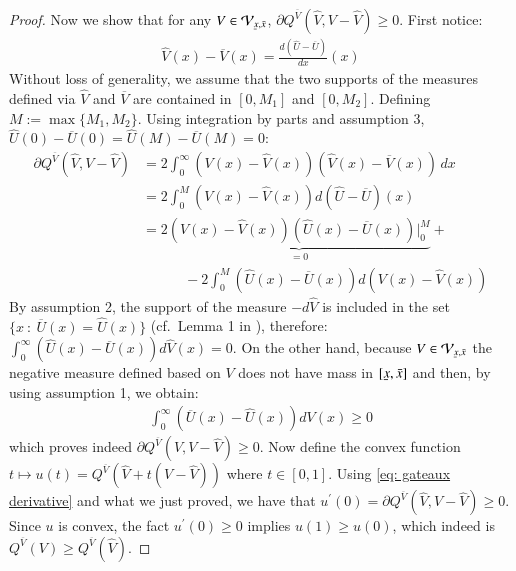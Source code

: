 \begin{proof}
    Now we show that for any $V \in \mathcal{V}_{\scriptstyle{\ubar{x},\bar{x}}}$, $\partial Q^{\overline{V}} (\hat{V}, V-\hat{V}) \geq 0$. First notice:
    \begin{align*}
        \hat{V}(x)-\overline{V}(x) = \frac{d(\hat{U}-\overline{U})}{dx}(x)
    \end{align*}
    Without loss of generality, we assume that the two supports of the measures defined via $\hat{V}$ and $\overline{V}$ are contained in $[0,M_1]$ and $[0,M_2]$. Defining $M := \max \{M_1,M_2\}$. Using integration by parts and assumption 3, $\hat{U}(0)-\overline{U}(0) = \hat{U}(M)-\overline{U}(M) = 0$:
    \begin{align*}
        \partial Q^{\overline{V}} (\hat{V}, V-\hat{V}) &= 2 \int_{0}^{\infty}  \left( V(x) - \hat{V}(x) \right) \left(\hat{V}(x) - \overline{V}(x) \right) \, dx \\
        &= 2 \int_{0}^{M}  \left( V(x) - \hat{V}(x) \right) d(\hat{U}-\overline{U}) (x) \\
        &=2 \underbrace{\left( V(x) - \hat{V}(x) \right) \left(\hat{U}(x)-\overline{U}(x)\right) \bigg|_{0}^{M}}_{=0} + \\
        &\quad \quad \quad - 2\int_{0}^{M} \left(\hat{U}(x)-\overline{U}(x)\right) d\left( V(x) - \hat{V}(x) \right) 
    \end{align*}
    By assumption 2, the support of the measure $- d \hat{V}$ is included in the set $\{x \: : \: \overline{U}(x) = \hat{U}(x) \}$ (cf.\ Lemma 1 in \cite{23}), therefore: $\int_{0}^{\infty} \left(\hat{U}(x)-\overline{U}(x)\right) d \hat{V}(x) =0 $. On the other hand, because $V \in \mathcal{V}_{\scriptstyle{\ubar{x},\bar{x}}}$ the negative measure defined based on $V$ does not have mass in $[\ubar{x},\bar{x}]$ and then, by using assumption 1, we obtain:
    \begin{align*}
        \int_{0}^{\infty} \left(\overline{U}(x) - \hat{U}(x)\right) d V(x) \geq 0
    \end{align*}
    which proves indeed $\partial Q^{\overline{V}} (\hat{V}, V-\hat{V})\geq 0$. Now define the convex function $t \mapsto u(t) = Q^{\overline{V}}(\hat{V}+ t (V- \hat{V}))$ where $t \in [0,1]$. Using \eqref{eq: gateaux derivative} and what we just proved, we have that $u^{\prime}(0) =\partial Q^{\overline{V}} (\hat{V}, V-\hat{V}) \geq 0$. Since $u$ is convex, the fact $u^{\prime}(0) \geq 0$ implies $u(1)\geq u(0)$, which indeed is $Q^{\overline{V}}(V) \geq Q^{\overline{V}}(\hat{V})$.
\end{proof}

